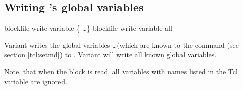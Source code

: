 






\subsection{Writing \es's global variables}

\begin{essyntax}
   blockfile  
  write variable \{  \dots \}
   blockfile  write variable all
\end{essyntax}

Variant  writes the global variables 
 \dots (which are known to the  command (see
section \vref{tcl:setmd}) to . Variant  will
write all known global variables.

Note, that when the block is read, all variables with names listed in
the Tcl variable  are ignored.

